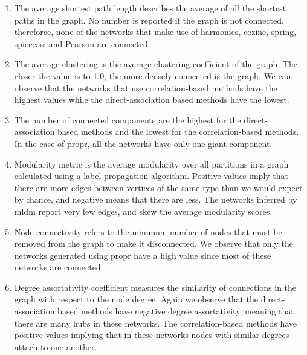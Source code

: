   \begin{enumerate}
    \item The average shortest path length describes the average of all the shortest paths in the graph. No number is reported if the graph is not connected, thereforce, none of the networks that make use of \ac{harmonies}, \ac{cozine}, \ac{spring}, \ac{spieceasi} and Pearson are connected.
    \item The average clustering is the average clustering coefficient of the graph. The closer the value is to 1.0, the more densely connected is the graph. We can observe that the networks that use correlation-based methods have the highest values while the direct-association based methods have the lowest.
    \item The number of connected components are the highest for the direct-association based methods and the lowest for the correlation-based methods. In the case of propr, all the networks have only one giant component.
    \item Modularity metric is the average modularity over all partitions in a graph calculated using a label propagation algorithm. Positive values imply that there are more edges between vertices of the same type than we would expect by chance, and negative means that there are less. The networks inferred by \ac{mldm} report very few edges, and skew the average modularity scores.
    \item Node connectivity refers to the minimum number of nodes that must be removed from the graph to make it disconnected. We observe that only the networks generated using propr have a high value since most of these networks are connected.
    \item Degree assortativity coefficient measures the similarity of connections in the graph with respect to the node degree. Again we observe that the direct-association based methods have negative degree assortativity, meaning that there are many hubs in these networks. The correlation-based methods have positive values implying that in these networks nodes with similar degrees attach to one another.
  \end{enumerate}

